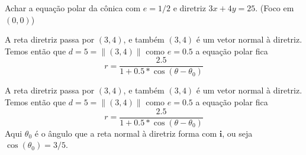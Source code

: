 \documentclass{beamer}
\begin{document}
\begin{frame}
  Achar a equação polar da cônica com $e=1/2$ e diretriz $3x+4y=25.$ (Foco em $(0,0)$)
  
\end{frame}

\begin{frame}
  A reta diretriz passa por $(3,4)$, e também $(3,4)$ é um vetor normal à diretriz. Temos então que
  $d=5 =\|(3,4)\|$ como $e=0.5$ a equação polar fica
  $$ r = \frac{2.5}{1+0.5*\cos(\theta-\theta_0)}$$

  
\end{frame}
A reta diretriz passa por $(3,4)$, e também $(3,4)$ é um vetor normal à diretriz. Temos então que
$d=5 =\|(3,4)\|$ como $e=0.5$ a equação polar fica
$$ r = \frac{2.5}{1+0.5*\cos(\theta-\theta_0)}$$
Aqui $\theta_0$ é o ângulo que a reta normal à diretriz forma com $\mathbf{i}$, ou seja 
$\cos(\theta_0)=3/5.$
\end{document}
